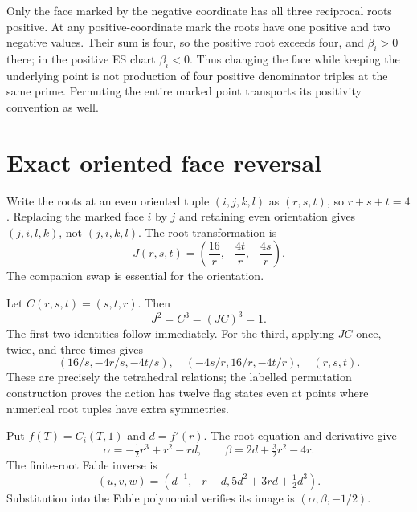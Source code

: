 \documentclass[11pt]{article}
\theoremstyle{remark}\newtheorem{remark}[theorem]{Remark}
\begin{document}
Only the face marked by the negative coordinate has all three reciprocal roots positive. At any positive-coordinate mark the roots have one positive and two negative values. Their sum is four, so the positive root exceeds four, and $\beta_i>0$ there; in the positive ES chart $\beta_i<0$. Thus changing the face while keeping the underlying point is not production of four positive denominator triples at the same prime. Permuting the entire marked point transports its positivity convention as well.

\section{Exact oriented face reversal}
Write the roots at an even oriented tuple $(i,j,k,l)$ as $(r,s,t)$, so $r+s+t=4$. Replacing the marked face $i$ by $j$ and retaining even orientation gives $(j,i,l,k)$, not $(j,i,k,l)$. The root transformation is
\begin{equation}\label{eq:J}
 J(r,s,t)=\left(\frac{16}{r},-\frac{4t}{r},-\frac{4s}{r}\right).
\end{equation}
The companion swap is essential for the orientation.

Let $C(r,s,t)=(s,t,r)$. Then
\begin{equation}\label{eq:relations}
 J^2=C^3=(JC)^3=1.
\end{equation}
The first two identities follow immediately. For the third, applying $JC$ once, twice, and three times gives
\[
 (16/s,-4r/s,-4t/s),\quad
 (-4s/r,16/r,-4t/r),\quad(r,s,t).
\]
These are precisely the tetrahedral relations; the labelled permutation construction proves the action has twelve flag states even at points where numerical root tuples have extra symmetries.

Put $f(T)=C_i(T,1)$ and $d=f'(r)$. The root equation and derivative give
\[
 \alpha=-\tfrac12r^3+r^2-rd,\qquad
 \beta=2d+\tfrac32r^2-4r.
\]
The finite-root Fable inverse is
\begin{equation}\label{eq:Fpoint}
 (u,v,w)=\left(d^{-1},-r-d,5d^2+3rd+\tfrac12d^3\right).
\end{equation}
Substitution into the Fable polynomial verifies its image is $(\alpha,\beta,-1/2)$.
\end{document}
